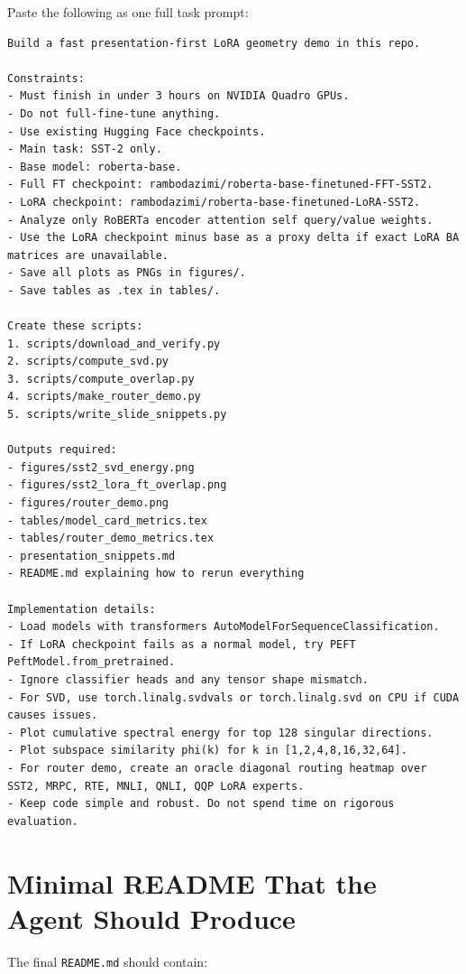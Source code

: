 \documentclass[11pt]{article}
\begin{document}
Paste the following as one full task prompt:

\begin{lstlisting}
Build a fast presentation-first LoRA geometry demo in this repo.

Constraints:
- Must finish in under 3 hours on NVIDIA Quadro GPUs.
- Do not full-fine-tune anything.
- Use existing Hugging Face checkpoints.
- Main task: SST-2 only.
- Base model: roberta-base.
- Full FT checkpoint: rambodazimi/roberta-base-finetuned-FFT-SST2.
- LoRA checkpoint: rambodazimi/roberta-base-finetuned-LoRA-SST2.
- Analyze only RoBERTa encoder attention self query/value weights.
- Use the LoRA checkpoint minus base as a proxy delta if exact LoRA BA matrices are unavailable.
- Save all plots as PNGs in figures/.
- Save tables as .tex in tables/.

Create these scripts:
1. scripts/download_and_verify.py
2. scripts/compute_svd.py
3. scripts/compute_overlap.py
4. scripts/make_router_demo.py
5. scripts/write_slide_snippets.py

Outputs required:
- figures/sst2_svd_energy.png
- figures/sst2_lora_ft_overlap.png
- figures/router_demo.png
- tables/model_card_metrics.tex
- tables/router_demo_metrics.tex
- presentation_snippets.md
- README.md explaining how to rerun everything

Implementation details:
- Load models with transformers AutoModelForSequenceClassification.
- If LoRA checkpoint fails as a normal model, try PEFT PeftModel.from_pretrained.
- Ignore classifier heads and any tensor shape mismatch.
- For SVD, use torch.linalg.svdvals or torch.linalg.svd on CPU if CUDA causes issues.
- Plot cumulative spectral energy for top 128 singular directions.
- Plot subspace similarity phi(k) for k in [1,2,4,8,16,32,64].
- For router demo, create an oracle diagonal routing heatmap over SST2, MRPC, RTE, MNLI, QNLI, QQP LoRA experts.
- Keep code simple and robust. Do not spend time on rigorous evaluation.
\end{lstlisting}

\section{Minimal README That the Agent Should Produce}

The final \texttt{README.md} should contain:
\end{document}
